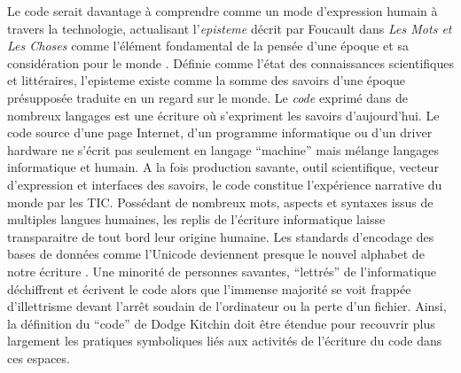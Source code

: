 Le code serait davantage à comprendre comme un mode d’expression humain à travers la technologie, actualisant l’\textit{episteme} décrit par Foucault dans \textit{Les Mots et Les Choses} comme l’élément fondamental de la pensée d’une époque et sa considération pour le monde \citep{Foucault1996}. Définie comme l’état des connaissances scientifiques et littéraires, l’episteme existe comme la somme des savoirs d’une époque présupposée traduite en un regard sur le monde. Le \textit{code} exprimé dans de nombreux langages est une écriture où s’expriment les savoirs d’aujourd’hui. Le code source d’une page Internet, d’un programme informatique ou d’un driver hardware ne s’écrit pas seulement en langage “machine” mais mélange langages informatique et humain. A la fois production savante, outil scientifique, vecteur d’expression et interfaces des savoirs, le code constitue l’expérience narrative du monde par les TIC. Possédant de nombreux mots, aspects et syntaxes issus de multiples langues humaines, les replis de l’écriture informatique laisse transparaitre de tout bord leur origine humaine. Les standards d’encodage des bases de données comme l’Unicode deviennent presque le nouvel alphabet de notre écriture \citep{Guichard2014}. Une minorité de personnes savantes, “lettrés” de l’informatique déchiffrent et écrivent le code alors que l’immense majorité se voit frappée d’illettrisme devant l’arrêt soudain de l’ordinateur ou la perte d’un fichier. Ainsi, la définition du “code” de Dodge  Kitchin doit être étendue pour recouvrir plus largement les pratiques symboliques liés aux activités de l’écriture du code dans ces espaces.

